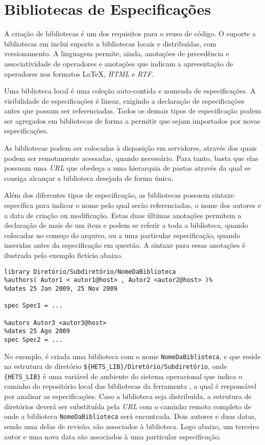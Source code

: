\section{Bibliotecas de Especificações}
A criação de bibliotecas é um dos requisitos para o reuso de código.
O suporte a bibliotecas em \CASL inclui suporte a bibliotecas locais e distribuídas, com versionamento.
A linguagem permite, ainda, anotações de precedência e associatividade de operadores e anotações que indicam a apresentação de operadores nos formatos \LaTeX, \textit{HTML} e \textit{RTF}.

Uma biblioteca local é uma coleção auto-contida e nomeada de especificações.
A visibilidade de especificações é linear, exigindo a declaração de especificações antes que possam ser referenciadas.
Todos os demais tipos de especificação podem ser agregados em bibliotecas de forma a permitir que sejam importados por novas especificações.

As bibliotecas podem ser colocadas à disposição em servidores, através dos quais podem ser remotamente acessadas, quando necessário.
Para tanto, basta que elas possuam uma \textit{URL} que obedeça a uma hierarquia de pastas através da qual se consiga alcançar a biblioteca desejada de forma única.

Além dos diferentes tipos de especificação, as bibliotecas possuem sintaxe específica para indicar o nome pelo qual serão referenciadas, o nome dos autores e a data de criação ou modificação.
Estas duas últimas anotações permitem a declaração de mais de um item e podem se referir a toda a biblioteca, quando colocadas no começo do arquivo, ou a uma particular especificação, quando inseridas antes da especificação em questão.
A sintaxe para essas anotações é ilustrada pelo exemplo fictício abaixo.
\begin{Verbatim}
library Diretório/Subdiretório/NomeDaBiblioteca
%authors( Autor1 < autor1@host> , Autor2 <autor2@host> )%
%dates 25 Jan 2009, 25 Nov 2009

spec Spec1 = ...

%autors Autor3 <autor3@host>
%dates 25 Ago 2009
spec Spec2 = ...
\end{Verbatim}

No exemplo, é criada uma biblioteca com o nome \Verb.NomeDaBiblioteca., e que reside na estrutura de diretório \Verb.${HETS_LIB}/Diretório/Subdiretório., onde \Verb.{HETS_LIB}. é uma variável de ambiente do sistema operacional que indica o caminho do repositório local das bibliotecas da ferramenta \Hets, a qual é responsável por analisar as especificações.
Caso a biblioteca seja distribuída, a estrutura de diretórios deverá ser substituída pela \textit{URL} com o caminho remoto completo de onde a biblioteca \Verb.NomeDaBiblioteca. será encontrada.
Dois autores e duas datas, sendo uma delas de revisão, são associados à biblioteca.
Logo abaixo, um terceiro autor e uma nova data são associados à uma particular especificação.

